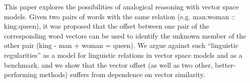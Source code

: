 This paper explores the possibilities of analogical reasoning with vector space models. Given two pairs of words with the same relation (e.g. man:woman :: king:queen), it was proposed that the offset between one pair of the corresponding word vectors can be used to identify the unknown member of the other pair (king - man + woman = queen). We argue against such ``linguistic regularities'' as a model for linguistic relations in vector space models and as a benchmark, and we show that the vector offset (as well as two other, better-performing methods) suffers from dependence on vector similarity.
